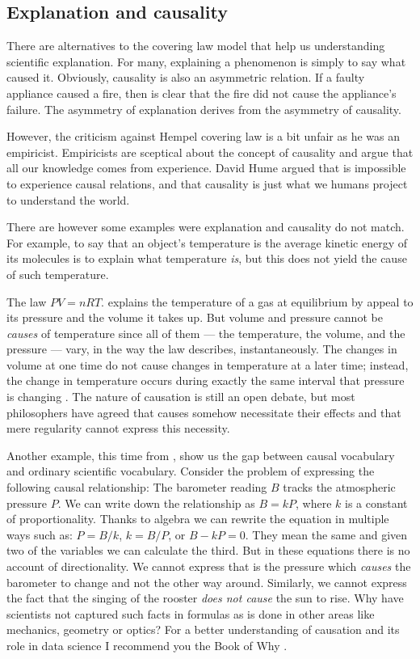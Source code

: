 \documentclass[
]{book}
\begin{document}
\hypertarget{explanation-and-causality}{%
\subsection{Explanation and causality}\label{explanation-and-causality}}

There are alternatives to the covering law model that help us understanding scientific explanation. For many, explaining a phenomenon is simply to say what caused it. Obviously, causality is also an asymmetric relation. If a faulty appliance caused a fire, then is clear that the fire did not cause the appliance's failure. The asymmetry of explanation derives from the asymmetry of causality.

However, the criticism against Hempel covering law is a bit unfair as he was an empiricist. Empiricists are sceptical about the concept of causality and argue that all our knowledge comes from experience. David Hume argued that is impossible to experience causal relations, and that causality is just what we humans project to understand the world.

There are however some examples were explanation and causality do not match. For example, to say that an object's temperature is the average kinetic energy of its molecules is to explain what temperature \emph{is}, but this does not yield the cause of such temperature.

The law \(PV = nRT.\) explains the temperature of a gas at equilibrium by appeal to its pressure and the volume it takes up. But volume and pressure cannot be \emph{causes} of temperature since all of them --- the temperature, the volume, and the pressure --- vary, in the way the law describes, instantaneously. The changes in volume at one time do not cause changes in temperature at a later time; instead, the change in temperature occurs during exactly the same interval that pressure is changing \citep{rosenberg2019philosophy}. The nature of causation is still an open debate, but most philosophers have agreed that causes somehow necessitate their effects and that mere regularity cannot express this necessity.

Another example, this time from \citep{book-of-why}, show us the gap between causal vocabulary and ordinary scientific vocabulary. Consider the problem of expressing the following causal relationship: The barometer reading \(B\) tracks the atmospheric pressure \(P\). We can write down the relationship as \(B = kP\), where \(k\) is a constant of proportionality. Thanks to algebra we can rewrite the equation in multiple ways such as: \(P = B/k\), \(k = B/P\), or \(B-kP = 0\). They mean the same and given two of the variables we can calculate the third. But in these equations there is no account of directionality. We cannot express that is the pressure which \emph{causes} the barometer to change and not the other way around. Similarly, we cannot express the fact that the singing of the rooster \emph{does not cause} the sun to rise. Why have scientists not captured such facts in formulas as is done in other areas like mechanics, geometry or optics? For a better understanding of causation and its role in data science I recommend you the Book of Why \citep{book-of-why}.
\end{document}
